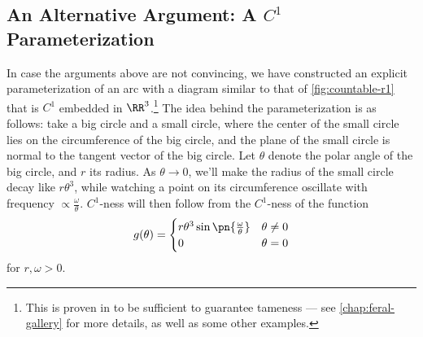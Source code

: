 \subsection{An Alternative Argument:
  A $C^1$ Parameterization}\label{sec:c1-countable-r1}
In case the arguments above are not convincing, we have constructed an
explicit parameterization of an arc with a diagram similar to that of
\cref{fig:countable-r1} that is $C^1$ embedded in
$\RR^3$.\footnote{This is proven in \cite{Crowell1963} to be
  sufficient to guarantee tameness --- see \cref{chap:feral-gallery}
  for more details, as well as some other examples.} The idea behind
the parameterization is as follows: take a big circle and a small
circle, where the center of the small circle lies on the circumference
of the big circle, and the plane of the small circle is normal to the
tangent vector of the big circle. Let $\theta$ denote the polar angle
of the big circle, and $r$ its radius. As $\theta \to 0$, we'll make
the radius of the small circle decay like $r\theta^3$, while watching
a point on its circumference oscillate with frequency $\propto
\frac{\omega}{\theta}$. $C^1$-ness will then follow from the
$C^1$-ness of the function
\begin{equation}\label{eq:g-equation}
  g(\theta) =
  \begin{cases}
    r\theta^3 \sin\pn{\frac{\omega}{\theta}} & \theta \neq 0 \\
    0 & \theta = 0
  \end{cases}
\end{equation}
for $r, \omega > 0$.
